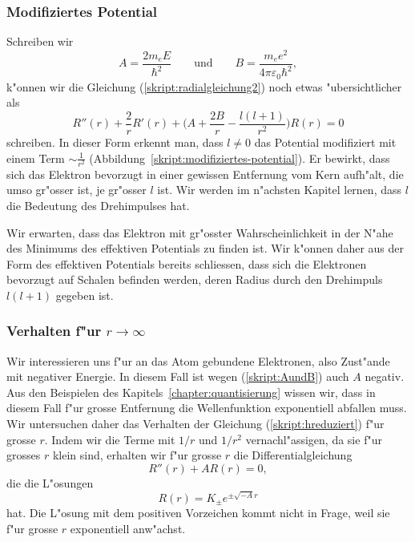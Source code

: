 \subsubsection{Modifiziertes Potential}
Schreiben wir
\begin{equation}
A=\frac{2m_eE}{\hbar^2}
\qquad\text{und}\qquad
B=\frac{m_ee^2}{4\pi\varepsilon_0\hbar^2},
\label{skript:AundB}
\end{equation}
k"onnen wir die Gleichung (\ref{skript:radialgleichung2})
noch etwas "ubersichtlicher als
\begin{equation}
R''(r)+\frac2{r}R'(r)+\biggl(A+\frac{2B}r-\frac{l(l+1)}{r^2}\biggr)R(r)=0
\label{skript:hreduziert}
\end{equation}
schreiben.
In dieser Form erkennt man, dass $l\ne 0$
das Potential modifiziert mit einem Term
$\sim\frac1{r^2}$ (Abbildung~\ref{skript:modifiziertes-potential}).
Er bewirkt, dass sich das Elektron bevorzugt in einer
gewissen Entfernung vom Kern aufh"alt, die umso gr"osser ist, je
gr"osser $l$ ist.
Wir werden im n"achsten Kapitel lernen, dass $l$ die Bedeutung des
Drehimpulses hat.

Wir erwarten, dass das Elektron mit gr"osster Wahrscheinlichkeit
in der N"ahe des Minimums des effektiven Potentials zu finden ist.
Wir k"onnen daher aus der Form des effektiven Potentials bereits
schliessen, dass sich die Elektronen bevorzugt auf Schalen befinden
werden, deren Radius durch den Drehimpuls $l(l+1)$ gegeben ist.

\subsubsection{Verhalten f"ur $r\to\infty$}
Wir interessieren uns f"ur an das Atom gebundene Elektronen, also
Zust"ande mit negativer Energie.
In diesem Fall ist wegen (\ref{skript:AundB}) auch $A$ negativ.
Aus den Beispielen des Kapitels~\ref{chapter:quantisierung} wissen wir,
dass in diesem Fall f"ur grosse Entfernung die Wellenfunktion exponentiell
abfallen muss.
Wir untersuchen daher das Verhalten der Gleichung (\ref{skript:hreduziert})
f"ur grosse $r$.
Indem wir die Terme mit $1/r$ und $1/r^2$ vernachl"assigen, da sie 
f"ur grosses $r$ klein sind, erhalten wir f"ur grosse $r$ die Differentialgleichung
\[
R''(r)+AR(r)=0,
\]
die die L"osungen
\[
R(r)=K_\pm e^{\pm\sqrt{-A}r}
\]
hat.
Die L"osung mit dem positiven Vorzeichen kommt nicht in Frage, weil
sie f"ur grosse $r$ exponentiell anw"achst.

